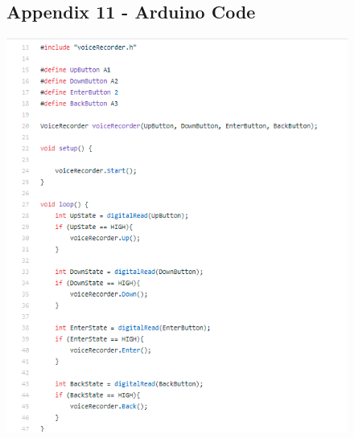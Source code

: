 \documentclass[11pt]{article}
\begin{document}
\begin{figure}
\subsection{Appendix 11 - Arduino Code }
    \centering
    \includegraphics[width=1\textwidth]{Images/arduino.png}
\end{figure}
\end{document}
